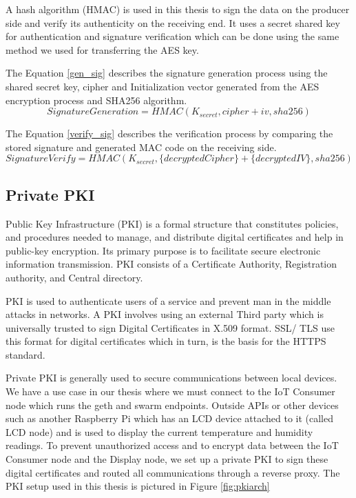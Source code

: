 \documentclass[11pt,openright]{report}
\begin{document}
A hash algorithm (HMAC) is used in this thesis to sign the data on the producer side and verify its authenticity on the receiving end. It uses a secret shared key for authentication and signature verification which can be done using the same method we used for transferring the AES key. 

The Equation \ref{gen_sig} describes the signature generation process using the shared secret key, cipher and Initialization vector generated from the AES encryption process and SHA256 algorithm.
\begin{equation}\label{gen_sig}
    SignatureGeneration = HMAC(K_{secret}, cipher + iv, sha256)
\end{equation}

The Equation \ref{verify_sig} describes the verification process by comparing the stored signature and generated MAC code on the receiving side.
\begin{equation}\label{verify_sig}
    SignatureVerify 
    = HMAC(K_{secret}, \{decryptedCipher\} + \{decryptedIV\}, sha256)
\end{equation}


\subsection{Private PKI} \label{priv_pki}
Public Key Infrastructure (PKI) is a formal structure that constitutes policies, and procedures needed to manage, and distribute digital certificates and help in public-key encryption. Its primary purpose is to facilitate secure electronic information transmission. PKI consists of a Certificate Authority, Registration authority, and Central directory.

PKI is used to authenticate users of a service and prevent man in the middle attacks in networks. A PKI involves using an external Third party which is universally trusted to sign Digital Certificates in X.509 format. SSL/ TLS use this format for digital certificates which in turn, is the basis for the HTTPS standard.

Private PKI is generally used to secure communications between local devices. We have a use case in our thesis where we must connect to the IoT Consumer node which runs the geth and swarm endpoints. Outside APIs or other devices such as another Raspberry Pi which has an LCD device attached to it (called LCD node) and is used to display the current temperature and humidity readings. To prevent unauthorized access and to encrypt data between the IoT Consumer node and the Display node, we set up a private PKI to sign these digital certificates and routed all communications through a reverse proxy. The PKI setup used in this thesis is pictured in Figure \ref{fig:pkiarch}
\end{document}

